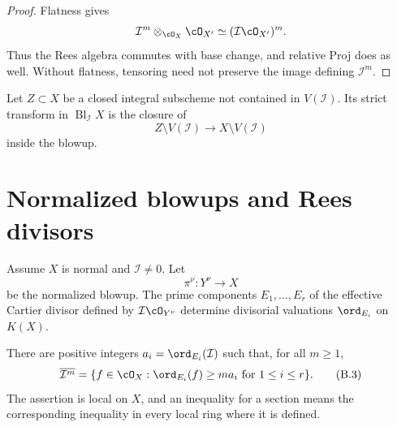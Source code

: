 \begin{proof}
Flatness gives
\[
 \mathcal I^m\otimes_{\cO_X}\cO_{X'}
   \simeq(\mathcal I\cO_{X'})^m.
\]
Thus the Rees algebra commutes with base change, and relative Proj does as
well.  Without flatness, tensoring need not preserve the image defining
\(\mathcal I^m\).
\end{proof}

\begin{definition}
\label{def:appB-strict-transform}
Let \(Z\subset X\) be a closed integral subscheme not contained in
\(V(\mathcal I)\).  Its strict transform in
\(\operatorname{Bl}_{\mathcal I}X\) is the closure of
\[
 Z\setminus V(\mathcal I)\longrightarrow
 X\setminus V(\mathcal I)
\]
inside the blowup.
\end{definition}

\section{Normalized blowups and Rees divisors}
\label{sec:appB-normalized-blowups}

Assume \(X\) is normal and \(\mathcal I\ne0\).  Let
\[
 \pi^\nu:Y^\nu\longrightarrow X
\tag{B.2}\label{eq:appB-normalized-blowup}
\]
be the normalized blowup.  The prime components
\(E_1,\ldots,E_r\) of the effective Cartier divisor defined by
\(\mathcal I\cO_{Y^\nu}\) determine divisorial valuations
\(\ord_{E_i}\) on \(K(X)\).

\begin{theorem}\label{thm:appB-rees-valuations}
There are positive integers
\(a_i=\ord_{E_i}(\mathcal I)\) such that, for all \(m\geq1\),
\[
 \overline{\mathcal I^m}
 =\{f\in\cO_X:
       \ord_{E_i}(f)\geq ma_i\text{ for }1\leq i\leq r\}.
\tag{B.3}\label{eq:appB-rees-valuations}
\]
The assertion is local on \(X\), and an inequality for a section means the
corresponding inequality in every local ring where it is defined.
\end{theorem}


